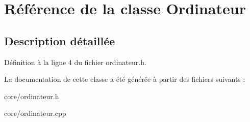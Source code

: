 \hypertarget{class_ordinateur}{
\section{Référence de la classe Ordinateur}
\label{d3/dad/class_ordinateur}
}


\subsection{Description détaillée}


Définition à la ligne 4 du fichier ordinateur.h.



La documentation de cette classe a été générée à partir des fichiers suivants :\begin{DoxyCompactItemize}
\item 
core/ordinateur.h\item 
core/ordinateur.cpp\end{DoxyCompactItemize}
